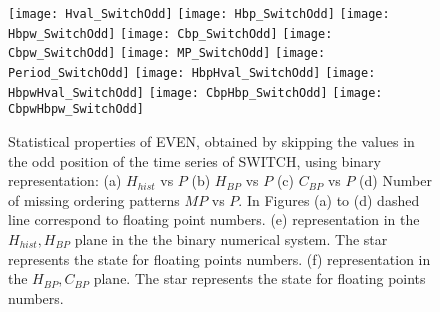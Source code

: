 \begin{figure}
	\texttt{[image: Hval\_SwitchOdd]}
	\texttt{[image: Hbp\_SwitchOdd]}
	\texttt{[image: Hbpw\_SwitchOdd]}
	\texttt{[image: Cbp\_SwitchOdd]}
	\texttt{[image: Cbpw\_SwitchOdd]}
	\texttt{[image: MP\_SwitchOdd]}
	\texttt{[image: Period\_SwitchOdd]}
	\texttt{[image: HbpHval\_SwitchOdd]}
	\texttt{[image: HbpwHval\_SwitchOdd]}
	\texttt{[image: CbpHbp\_SwitchOdd]}
	\texttt{[image: CbpwHbpw\_SwitchOdd]}
	\caption{Statistical properties of EVEN, obtained by skipping the values in the odd position of the time series of  SWITCH,  using binary representation: (a) $H_{hist}$ vs $P$ (b) $H_{BP}$ vs $P$ (c) $C_{BP}$ vs $P$ (d) Number of missing ordering patterns $MP$ vs $P$. In Figures (a) to (d) dashed line correspond to floating point numbers. (e) representation in the $H_{hist},H_{BP}$ plane in the the binary numerical system.  The star represents the state for floating points numbers. (f) representation in the $H_{BP},C_{BP}$ plane.  The star represents the state for floating points numbers.  } \label{fig:seqimparbin}
\end{figure}